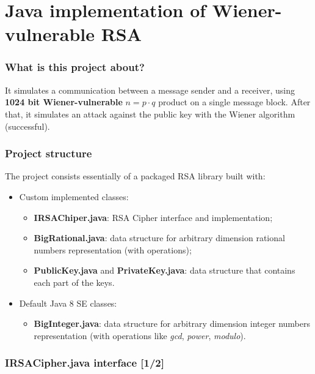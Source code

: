 \documentclass{beamer}
\begin{document}
\section{Java implementation of Wiener-vulnerable RSA}

  \frame{\sectionpage}
  
  \begin{frame}
  \frametitle{What is this project about?}
    It simulates a communication between a message sender and a receiver, using \textbf{1024 bit Wiener-vulnerable} $n = p \cdot q$ product on a single message block. After that, it simulates an attack against the public key with the Wiener algorithm (successful).
  \end{frame}
  
    \begin{frame}
    \frametitle{Project structure}
    
    The project consists essentially of a packaged RSA library built with:
    
    \begin{itemize}
    	\item Custom implemented classes:
    	\begin{itemize}
    		\item \textbf{IRSAChiper.java}: RSA Cipher interface and implementation;
    		\item \textbf{BigRational.java}: data structure for arbitrary dimension rational numbers representation (with operations);
    		\item \textbf{PublicKey.java} and \textbf{PrivateKey.java}: data structure that contains each part of the keys.
    	\end{itemize}
    	\item Default Java 8 SE classes:
    		\begin{itemize}
    			\item \textbf{BigInteger.java}: data structure for arbitrary dimension integer numbers representation (with operations like \textit{gcd}, \textit{power}, \textit{modulo}).
    		\end{itemize}
    	\end{itemize}
    
    
    
    
  
  \end{frame}
  
  
\begin{frame}
  \frametitle{IRSACipher.java interface [1/2]}
    
    \lstset{basicstyle=\tiny}
    
    
  \end{frame}
  
\end{document}
